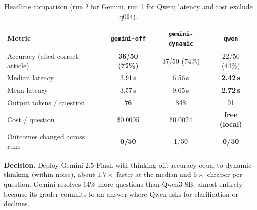 \documentclass[11pt]{article}
\newcommand{\cfg}[1]{\texttt{#1}}
\begin{document}
\begin{table}[h]
\centering
\caption{Headline comparison (run 2 for Gemini, run 1 for Qwen; latency and cost exclude q004).}
\label{tab:summary}
\begin{tabular}{@{}lccc@{}}
\toprule
Metric & \cfg{gemini-off} & \cfg{gemini-dynamic} & \cfg{qwen} \\
\midrule
Accuracy (cited correct article) & \textbf{36/50 (72\%)} & 37/50 (74\%) & 22/50 (44\%) \\
Median latency                   & 3.91\,s & 6.56\,s & \textbf{2.42\,s} \\
Mean latency                     & 3.57\,s & 9.65\,s & \textbf{2.72\,s} \\
Output tokens / question         & \textbf{76} & 848 & 91 \\
Cost / question                  & \$0.0005 & \$0.0024 & \textbf{free (local)} \\
Outcomes changed across runs     & \textbf{0/50} & 1/50 & \textbf{0/50} \\
\bottomrule
\end{tabular}
\end{table}

\noindent\textbf{Decision.} Deploy Gemini 2.5 Flash with thinking off: accuracy equal to dynamic thinking
(within noise), about $1.7\times$ faster at the median and $5\times$ cheaper per question. Gemini resolves
64\% more questions than Qwen3-8B, almost entirely because its grader commits to an answer where Qwen
asks for clarification or declines.
\end{document}
